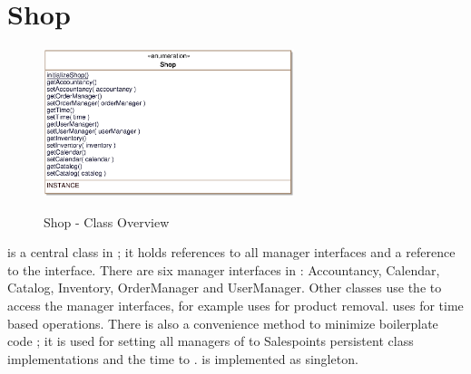 \section{Shop}
\label{shop}

\begin{figure}[ht]
	\centering
  \includegraphics[width=0.65\textwidth]{images/Shop_Overview.eps}
	\label{shop_overview}
	\caption{Shop - Class Overview}
\end{figure}

 is a central class in \salespoint{}; it holds references to all manager interfaces and a reference to the  interface.
There are six manager interfaces in \salespoint{}: Accountancy, Calendar, Catalog, Inventory, OrderManager and UserManager.
Other classes use the  to access the manager interfaces, for example  uses  for product removal.
 uses  for time based operations.
There is also a convenience method to minimize boilerplate code ; it is used for setting all managers of  to Salespoints persistent class implementations and the time to .
 is implemented as singleton.

